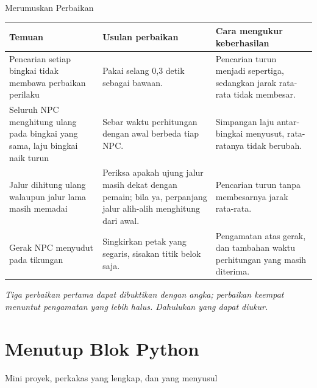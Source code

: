 \documentclass[aspectratio=169,10pt]{beamer}
\begin{document}
\begin{frame}{Merumuskan Perbaikan}
{\scriptsize
\renewcommand{\arraystretch}{1.26}
\begin{tabularx}{\textwidth}{@{}>{\raggedright\arraybackslash}p{3.5cm}
    >{\raggedright\arraybackslash}p{4.4cm}
    >{\raggedright\arraybackslash}X@{}}
\toprule
\textbf{Temuan} & \textbf{Usulan perbaikan} & \textbf{Cara mengukur
keberhasilan} \\
\midrule
Pencarian setiap bingkai tidak membawa perbaikan perilaku &
  Pakai selang 0,3 detik sebagai bawaan. &
  Pencarian turun menjadi sepertiga, sedangkan jarak rata-rata tidak membesar. \\
\addlinespace
Seluruh NPC menghitung ulang pada bingkai yang sama, laju bingkai naik turun &
  Sebar waktu perhitungan dengan awal berbeda tiap NPC. &
  Simpangan laju antar-bingkai menyusut, rata-ratanya tidak berubah. \\
\addlinespace
Jalur dihitung ulang walaupun jalur lama masih memadai &
  Periksa apakah ujung jalur masih dekat dengan pemain; bila ya, perpanjang
  jalur alih-alih menghitung dari awal. &
  Pencarian turun tanpa membesarnya jarak rata-rata. \\
\addlinespace
Gerak NPC menyudut pada tikungan &
  Singkirkan petak yang segaris, sisakan titik belok saja. &
  Pengamatan atas gerak, dan tambahan waktu perhitungan yang masih diterima. \\
\bottomrule
\end{tabularx}}
\vspace{0.10cm}
{\footnotesize\color{ubMuted}\itshape Tiga perbaikan pertama dapat dibuktikan
dengan angka; perbaikan keempat menuntut pengamatan yang lebih halus. Dahulukan
yang dapat diukur.}
\end{frame}

\section{Menutup Blok Python}
  {Mini proyek, perkakas yang lengkap, dan yang menyusul}
\end{document}
